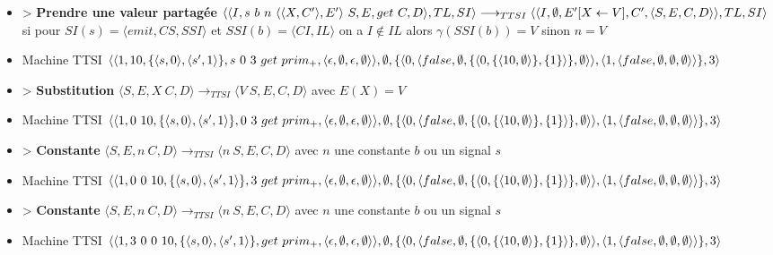 \documentclass[10pt,a4paper]{article}
\begin{document}
\begin{itemize}
					\item[] > \textbf{Prendre une valeur partagée} $\langle\langle I,s~b~n~\langle\langle X,C'\rangle,E'\rangle~S,E,get~C,D\rangle,TL,SI\rangle 
					\longrightarrow_{TTSI} 
					\\\langle\langle I,\emptyset,E'[X \leftarrow V],C',\langle S,E,C,D\rangle\rangle,TL,SI\rangle$
					\\ si pour $SI(s) = \langle emit,CS,SSI\rangle$ et $SSI(b) = \langle CI,IL\rangle$ on a $I \notin IL$ alors $\gamma(SSI(b)) = V$ sinon $n = V$
					\item[] Machine TTSI $\langle\langle 1,10,\{\langle s,0\rangle,\langle s',1\rangle\},s~0~3~get~prim_{+} ,\langle\epsilon,\emptyset,\epsilon,\emptyset\rangle\rangle,\emptyset,\{\langle 0,\langle false,\emptyset,\{\langle 0,\{\langle 10,\emptyset\rangle\},\{1\}\rangle\},\emptyset\rangle\rangle,\\\langle 1,\langle false,\emptyset,\emptyset,\emptyset\rangle\rangle\},3\rangle$ 
					\item[] > \textbf{Substitution} $\langle S,E,X~C,D\rangle
					\longrightarrow_{TTSI} 
					\langle V~S,E,C,D\rangle$ avec $E(X) = V$
					\item[] Machine TTSI $\langle\langle 1,0~10,\{\langle s,0\rangle,\langle s',1\rangle\},0~3~get~prim_{+} ,\langle\epsilon,\emptyset,\epsilon,\emptyset\rangle\rangle,\emptyset,\{\langle 0,\langle false,\emptyset,\{\langle 0,\{\langle 10,\emptyset\rangle\},\{1\}\rangle\},\emptyset\rangle\rangle,\\\langle 1,\langle false,\emptyset,\emptyset,\emptyset\rangle\rangle\},3\rangle$ 
					\item[] > \textbf{Constante} $\langle S,E,n~C,D\rangle 
					\longrightarrow_{TTSI} 
					\langle n~S,E,C,D\rangle$ avec $n$ une constante $b$ ou un signal $s$
					\item[] Machine TTSI $\langle\langle 1,0~0~10,\{\langle s,0\rangle,\langle s',1\rangle\},3~get~prim_{+} ,\langle\epsilon,\emptyset,\epsilon,\emptyset\rangle\rangle,\emptyset,\{\langle 0,\langle false,\emptyset,\{\langle 0,\{\langle 10,\emptyset\rangle\},\{1\}\rangle\},\emptyset\rangle\rangle,\\\langle 1,\langle false,\emptyset,\emptyset,\emptyset\rangle\rangle\},3\rangle$ 
					\item[] > \textbf{Constante} $\langle S,E,n~C,D\rangle 
					\longrightarrow_{TTSI} 
					\langle n~S,E,C,D\rangle$ avec $n$ une constante $b$ ou un signal $s$
					\item[] Machine TTSI $\langle\langle 1,3~0~0~10,\{\langle s,0\rangle,\langle s',1\rangle\},get~prim_{+} ,\langle\epsilon,\emptyset,\epsilon,\emptyset\rangle\rangle,\emptyset,\{\langle 0,\langle false,\emptyset,\{\langle 0,\{\langle 10,\emptyset\rangle\},\{1\}\rangle\},\emptyset\rangle\rangle,\\\langle 1,\langle false,\emptyset,\emptyset,\emptyset\rangle\rangle\},3\rangle$ 

\end{itemize}
\end{document}
